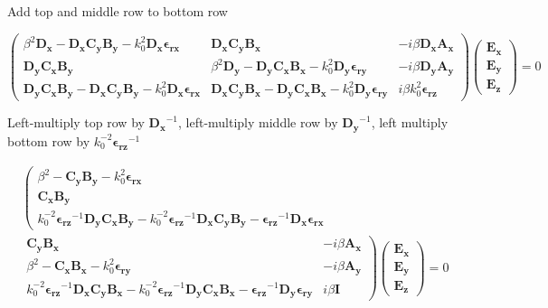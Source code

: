 \documentclass[]{article}
\begin{document}
Add top and middle row to bottom row

\begin{equation*}
\begin{pmatrix}
\beta^2 \mathbf{D_x} - \mathbf{D_x} \mathbf{C_y} \mathbf{B_y} - k_0^2 \mathbf{D_x} \mathbf{\epsilon_{rx}}
&
\mathbf{D_x} \mathbf{C_y} \mathbf{B_x}
&
-i \beta \mathbf{D_x} \mathbf{A_x}
\\
\mathbf{D_y} \mathbf{C_x} \mathbf{B_y}
&
\beta^2 \mathbf{D_y} - \mathbf{D_y} \mathbf{C_x}\mathbf{B_x} - k_0^2 \mathbf{D_y} \mathbf{\epsilon_{ry}} 
&
-i \beta \mathbf{D_y} \mathbf{A_y}
\\
\mathbf{D_y} \mathbf{C_x} \mathbf{B_y} - \mathbf{D_x} \mathbf{C_y} \mathbf{B_y} - k_0^2 \mathbf{D_x} \mathbf{\epsilon_{rx}}
&
\mathbf{D_x} \mathbf{C_y} \mathbf{B_x} - \mathbf{D_y} \mathbf{C_x}\mathbf{B_x} - k_0^2 \mathbf{D_y} \mathbf{\epsilon_{ry}} 
&
i \beta k_0^2 \mathbf{\epsilon_{rz}}
\end{pmatrix}
\begin{pmatrix}
\mathbf{E_x} \\
\mathbf{E_y} \\
\mathbf{E_z}
\end{pmatrix}
=0
\end{equation*}

Left-multiply top row by $\mathbf{D_x}^{-1}$, left-multiply middle row by $\mathbf{D_y}^{-1}$, left multiply bottom row by $k_0^{-2} \mathbf{\epsilon_{rz}}^{-1}$

\begin{multline*}
\left(
\begin{matrix}
\beta^2 - \mathbf{C_y} \mathbf{B_y} - k_0^2 \mathbf{\epsilon_{rx}}
\\
\mathbf{C_x} \mathbf{B_y}
\\
k_0^{-2} \mathbf{\epsilon_{rz}}^{-1} \mathbf{D_y} \mathbf{C_x} \mathbf{B_y} - k_0^{-2} \mathbf{\epsilon_{rz}}^{-1} \mathbf{D_x} \mathbf{C_y} \mathbf{B_y} -  \mathbf{\epsilon_{rz}}^{-1} \mathbf{D_x} \mathbf{\epsilon_{rx}}
\end{matrix}
\right.
\\
\left.
\begin{matrix}
\mathbf{C_y} \mathbf{B_x}
&
-i \beta \mathbf{A_x}
\\
\beta^2 - \mathbf{C_x} \mathbf{B_x} - k_0^2  \mathbf{\epsilon_{ry}} 
&
-i \beta \mathbf{A_y}
\\
k_0^{-2} \mathbf{\epsilon_{rz}}^{-1} \mathbf{D_x} \mathbf{C_y} \mathbf{B_x} - k_0^{-2} \mathbf{\epsilon_{rz}}^{-1} \mathbf{D_y} \mathbf{C_x}\mathbf{B_x} - \mathbf{\epsilon_{rz}}^{-1} \mathbf{D_y} \mathbf{\epsilon_{ry}} 
&
i \beta \mathbf{I}
\end{matrix}
\right)
\begin{pmatrix}
\mathbf{E_x} \\
\mathbf{E_y} \\
\mathbf{E_z}
\end{pmatrix}
=0
\end{multline*}
\end{document}
